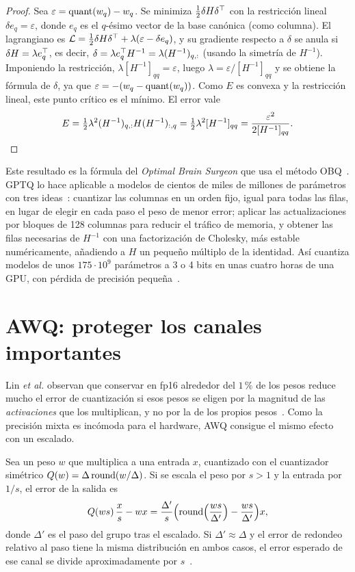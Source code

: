 \begin{proof}
Sea $\varepsilon=\operatorname{quant}(w_q)-w_q$. Se minimiza $\tfrac12\delta H\delta^{\top}$ con la restricción lineal $\delta e_q=\varepsilon$, donde $e_q$ es el $q$-ésimo vector de la base canónica (como columna). El lagrangiano es $\mathcal{L}=\tfrac12\delta H\delta^{\top}+\lambda(\varepsilon-\delta e_q)$, y su gradiente respecto a $\delta$ se anula si $\delta H=\lambda e_q^{\top}$, es decir, $\delta=\lambda e_q^{\top} H^{-1}=\lambda(H^{-1})_{q,:}$ (usando la simetría de $H^{-1}$). Imponiendo la restricción, $\lambda[H^{-1}]_{qq}=\varepsilon$, luego $\lambda=\varepsilon/[H^{-1}]_{qq}$ y se obtiene la fórmula de $\delta$, ya que $\varepsilon=-(w_q-\operatorname{quant}(w_q))$. Como $E$ es convexa y la restricción lineal, este punto crítico es el mínimo. El error vale
\[
E=\tfrac12\lambda^{2}(H^{-1})_{q,:}H(H^{-1})_{:,q}=\tfrac12\lambda^{2}[H^{-1}]_{qq}=\frac{\varepsilon^{2}}{2[H^{-1}]_{qq}}.\qedhere
\]
\end{proof}

Este resultado es la fórmula del \emph{Optimal Brain Surgeon} que usa el método OBQ~\cite[§3, ec.~2]{gptq}. GPTQ lo hace aplicable a modelos de cientos de miles de millones de parámetros con tres ideas~\cite[§4]{gptq}: cuantizar las columnas en un orden fijo, igual para todas las filas, en lugar de elegir en cada paso el peso de menor error; aplicar las actualizaciones por bloques de 128 columnas para reducir el tráfico de memoria, y obtener las filas necesarias de $H^{-1}$ con una factorización de Cholesky, más estable numéricamente, añadiendo a $H$ un pequeño múltiplo de la identidad. Así cuantiza modelos de unos $175\cdot 10^{9}$ parámetros a 3 o 4 bits en unas cuatro horas de una GPU, con pérdida de precisión pequeña~\cite{gptq}.

\section{AWQ: proteger los canales importantes}

Lin \emph{et al.} observan que conservar en fp16 alrededor del $1\,\%$ de los pesos reduce mucho el error de cuantización si esos pesos se eligen por la magnitud de las \emph{activaciones} que los multiplican, y no por la de los propios pesos~\cite[§3.1]{awq}. Como la precisión mixta es incómoda para el hardware, AWQ consigue el mismo efecto con un escalado.

\begin{proposicion}\label{prop:awq}
Sea un peso $w$ que multiplica a una entrada $x$, cuantizado con el cuantizador simétrico $Q(w)=\Delta\operatorname{round}(w/\Delta)$. Si se escala el peso por $s>1$ y la entrada por $1/s$, el error de la salida es
\[
Q(ws)\,\frac{x}{s}-wx=\frac{\Delta'}{s}\Bigl(\operatorname{round}\Bigl(\frac{ws}{\Delta'}\Bigr)-\frac{ws}{\Delta'}\Bigr)x,
\]
donde $\Delta'$ es el paso del grupo tras el escalado. Si $\Delta'\approx\Delta$ y el error de redondeo relativo al paso tiene la misma distribución en ambos casos, el error esperado de ese canal se divide aproximadamente por $s$~\cite[§3.2, ecs.~2 y~3]{awq}.
\end{proposicion}

